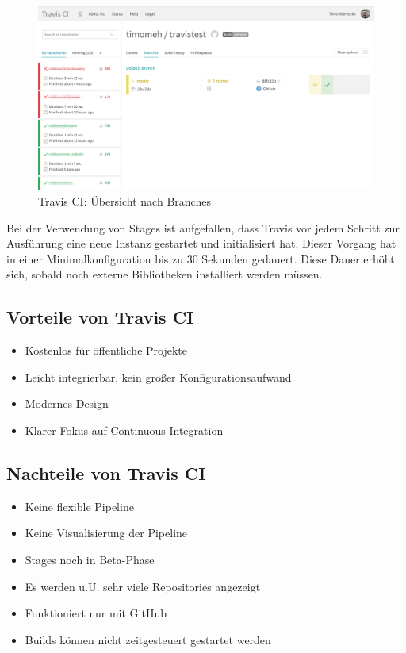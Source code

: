 \begin{figure}[h]
  \caption{Travis CI: Übersicht nach Branches}
  \label{fig:travis-branch}
  \includegraphics[width=.8\textwidth]{assets/travis-branch}
\end{figure}

Bei der Verwendung von Stages ist aufgefallen, dass Travis vor jedem Schritt zur Ausführung eine neue Instanz gestartet und initialisiert hat. Dieser Vorgang hat in einer Minimalkonfiguration bis zu 30 Sekunden gedauert. Diese Dauer erhöht sich, sobald noch externe Bibliotheken installiert werden müssen.

\subsection*{Vorteile von Travis CI}

\begin{itemize}
  \item Kostenlos für öffentliche Projekte
  \item Leicht integrierbar, kein großer Konfigurationsaufwand
  \item Modernes Design
  \item Klarer Fokus auf Continuous Integration
\end{itemize}

\subsection*{Nachteile von Travis CI}

\begin{itemize}
  \item Keine flexible Pipeline
  \item Keine Visualisierung der Pipeline
  \item Stages noch in Beta-Phase
  \item Es werden u.U. sehr viele Repositories angezeigt
  \item Funktioniert nur mit GitHub
  \item Builds können nicht zeitgesteuert gestartet werden
\end{itemize}

